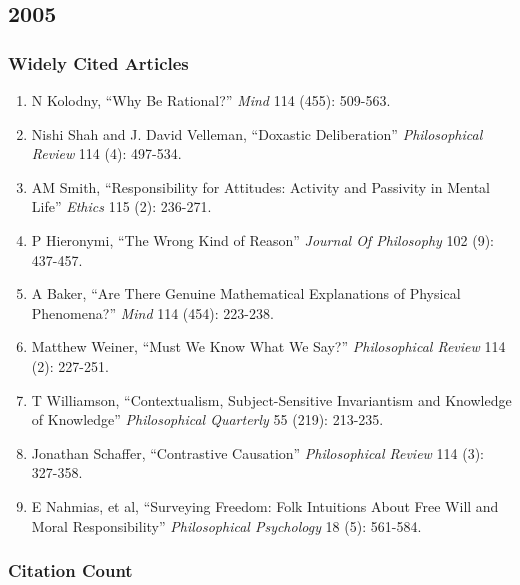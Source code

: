 \documentclass[
  10pt,
  letterpaper,
  DIV=11,
  numbers=noendperiod,
  twoside]{scrartcl}
\providecommand{\tightlist}{%
  \setlength{\itemsep}{0pt}\setlength{\parskip}{0pt}}\usepackage{longtable,booktabs,array}
\begin{document}
\newpage

\subsection{2005}\label{section-29}

\subsubsection*{Widely Cited Articles}\label{widely-cited-articles-29}

\begin{enumerate}
\def\labelenumi{\arabic{enumi}.}
\tightlist
\item
  N Kolodny, ``Why Be Rational?'' \emph{Mind} 114 (455): 509-563.
\item
  Nishi Shah and J. David Velleman, ``Doxastic Deliberation''
  \emph{Philosophical Review} 114 (4): 497-534.
\item
  AM Smith, ``Responsibility for Attitudes: Activity and Passivity in
  Mental Life'' \emph{Ethics} 115 (2): 236-271.
\item
  P Hieronymi, ``The Wrong Kind of Reason'' \emph{Journal Of Philosophy}
  102 (9): 437-457.
\item
  A Baker, ``Are There Genuine Mathematical Explanations of Physical
  Phenomena?'' \emph{Mind} 114 (454): 223-238.
\item
  Matthew Weiner, ``Must We Know What We Say?'' \emph{Philosophical
  Review} 114 (2): 227-251.
\item
  T Williamson, ``Contextualism, Subject-Sensitive Invariantism and
  Knowledge of Knowledge'' \emph{Philosophical Quarterly} 55 (219):
  213-235.
\item
  Jonathan Schaffer, ``Contrastive Causation'' \emph{Philosophical
  Review} 114 (3): 327-358.
\item
  E Nahmias, et al, ``Surveying Freedom: Folk Intuitions About Free Will
  and Moral Responsibility'' \emph{Philosophical Psychology} 18 (5):
  561-584.
\end{enumerate}

\subsubsection*{Citation Count}\label{citation-count-29}
\end{document}
